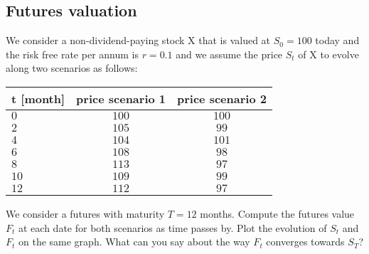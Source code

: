 \subsection*{Futures valuation}

We consider a non-dividend-paying stock X that is valued at $S_0=100$ today and the risk free rate per annum is $r = 0.1$ and we assume the price $S_t$ of X to evolve along two scenarios as follows:
%
\begin{center}
\begin{tabular}{lcc}
    t [month] & price scenario 1 & price scenario 2 \\
\hline
$0$ & $100$ & $100$ \\
$2$ & $105$ & $99$  \\
$4$ & $104$ & $101$  \\
$6$ & $108$ & $98$ \\
$8$ & $113$ & $97$ \\
$10$& $109$ & $99$ \\
$12$& $112$ & $97$ 
\end{tabular}
\end{center}

We consider a futures with maturity $T = 12$ months. Compute the futures value $F_t$ at each date for both scenarios as time passes by. Plot the evolution of $S_t$ and $F_t$ on the same graph. What can you say about the way $F_t$ converges towards $S_T$?

